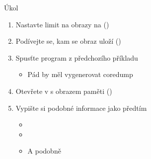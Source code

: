 \begin{frame}{Úkol}

  \begin{enumerate}
    \item Nastavte limit na obrazy na  ()
    \item Podívejte se, kam se obraz uloží ()
    \item Spusťte program z předchozího příkladu
    \begin{itemize}
      \item Pád by měl vygenerovat coredump
    \end{itemize}

    \item Otevřete v  s obrazem paměti ()
    \item Vypište si podobné informace jako předtím
    \begin{itemize}
      \item {}
      \item {}
      \item A podobně
    \end{itemize}
  \end{enumerate}

\end{frame}

